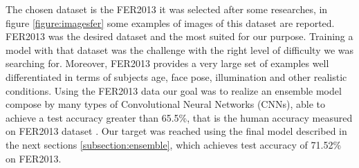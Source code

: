 \documentclass[10pt,twocolumn,letterpaper]{article}
\begin{document}
The chosen dataset is the FER2013 it was selected after some researches, in figure \ref{figure:imagesfer} some examples of images of this dataset are reported. FER2013 was the desired dataset and the most suited for our purpose. Training a model with that dataset was the challenge with the right level of difficulty we was searching for. Moreover, FER2013 provides a very large set of examples well differentiated in terms of subjects age, face pose, illumination and other realistic conditions. Using the FER2013 data our goal was to realize an ensemble model compose by many types of Convolutional Neural Networks (CNNs), able to achieve a test accuracy greater than 65.5\%, that is the human accuracy measured on FER2013 dataset \cite{3}. Our target was reached using the final model described in the next sections \ref{subsection:ensemble}, which achieves test accuracy of 71.52\% on FER2013.
\end{document}
